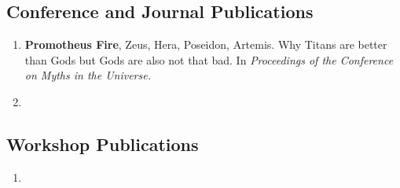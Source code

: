 \subsection{Conference and Journal Publications}

\begin{enumerate}
	\item \textbf{Promotheus Fire}\ec, Zeus\ec, Hera, Poseidon, Artemis. Why Titans are better than Gods but Gods are also not that bad. In \textit{Proceedings of the  Conference on Myths in the Universe.}
	\item \lipsum[1][1-3]
	\setcounter{publicationCounter}{\value{enumi}}	%
\end{enumerate}

\subsection{Workshop Publications}
\begin{enumerate}
	\setcounter{enumi}{\value{publicationCounter}}	%
	\item \lipsum[1][4-7]
	\setcounter{publicationCounter}{\value{enumi}}	%
\end{enumerate}

